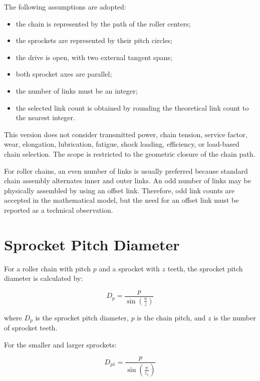 \documentclass[11pt,a4paper]{article}
\begin{document}
The following assumptions are adopted:

\begin{itemize}
    \item the chain is represented by the path of the roller centers;
    \item the sprockets are represented by their pitch circles;
    \item the drive is open, with two external tangent spans;
    \item both sprocket axes are parallel;
    \item the number of links must be an integer;
    \item the selected link count is obtained by rounding the theoretical link count to the nearest integer.
\end{itemize}

This version does not consider transmitted power, chain tension, service factor, wear, elongation, lubrication, fatigue, shock loading, efficiency, or load-based chain selection. The scope is restricted to the geometric closure of the chain path.

For roller chains, an even number of links is usually preferred because standard chain assembly alternates inner and outer links. An odd number of links may be physically assembled by using an offset link. Therefore, odd link counts are accepted in the mathematical model, but the need for an offset link must be reported as a technical observation.

\section{Sprocket Pitch Diameter}

For a roller chain with pitch $p$ and a sprocket with $z$ teeth, the sprocket pitch diameter is calculated by:

\begin{equation}
    D_p = \frac{p}{\sin\left(\frac{\pi}{z}\right)}
\end{equation}

where $D_p$ is the sprocket pitch diameter, $p$ is the chain pitch, and $z$ is the number of sprocket teeth.

For the smaller and larger sprockets:

\begin{equation}
    D_{p1} = \frac{p}{\sin\left(\frac{\pi}{z_1}\right)}
\end{equation}
\end{document}

